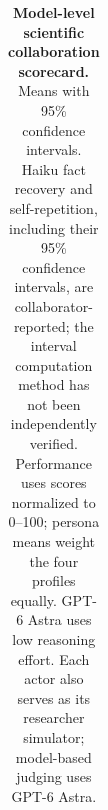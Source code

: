\begin{table}[!htbp]
\begin{tabular*}{\linewidth}{@{\extracolsep{\fill}}lcccc@{}}
\bottomrule
\end{tabular*}

\endgroup

\caption{
\textbf{Model-level scientific collaboration scorecard.}
Means with 95\% confidence intervals.
Haiku fact recovery and self-repetition, including their 95\% confidence intervals, are collaborator-reported; the interval computation method has not been independently verified.
Performance uses scores normalized to 0--100; persona means weight the four profiles equally.
GPT-6 Astra uses low reasoning effort.
Each actor also serves as its researcher simulator; model-based judging uses GPT-6 Astra.
}

\label{tab:model-scorecard}
\end{table}
